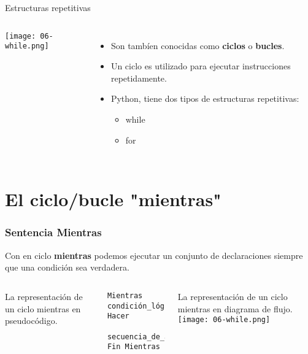 
\begin{frame}[c]{Estructuras repetitivas}
  \begin{columns}
      \begin{center}
        \texttt{[image: 06-while.png]}
      \end{center}
    \begin{itemize}
      \item Son tambíen conocidas como \textbf{ciclos} o \textbf{bucles}.
      \pausa
      \item Un ciclo es utilizado para ejecutar instrucciones repetidamente.
      \pausa
      \item Python, tiene dos tipos de estructuras repetitivas:
        \begin{itemize}
          \item \textcolor{codeKeyword}{while}
          \item \textcolor{codeKeyword}{for}
        \end{itemize}
    \end{itemize}
  \end{columns}
\end{frame}

\section{El ciclo/bucle "mientras"}

\begin{frame}[fragile]
  \frametitle{Sentencia Mientras}
  Con en ciclo \textbf{mientras} podemos ejecutar un conjunto de
  declaraciones siempre que una condición sea verdadera.

  \begin{columns}
    La representación de un ciclo mientras en pseudocódigo.
    \vspace{\baselineskip}
    \begin{lstlisting}[style=pseudocodigo]
Mientras condición_lógica Hacer
		secuencia_de_acciones
Fin Mientras
    \end{lstlisting}

    \pausa
    La representación de un ciclo mientras en diagrama de flujo.
    \texttt{[image: 06-while.png]}
  \end{columns}
\end{frame}

